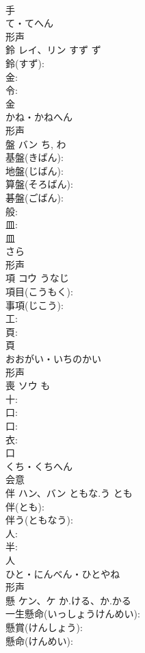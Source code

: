 \documentclass[8pt]{extreport}
\begin{document}
\begin{CJK}{UTF8}{min}
\\	手	
\\	て・てへん	
\\	形声 
\\	鈴	レイ、リン	すず	ず	
\\	鈴(すず): 
\\	金: 
\\	令: 
\\	金	
\\	かね・かねへん	
\\	形声 
\\	盤	バン		ち, わ	
\\	基盤(きばん): 
\\	地盤(じばん): 
\\	算盤(そろばん): 
\\	碁盤(ごばん): 
\\	般: 
\\	皿: 
\\	皿	
\\	さら	
\\	形声 
\\	項	コウ	うなじ		
\\	項目(こうもく): 
\\	事項(じこう): 
\\	工: 
\\	頁: 
\\	頁	
\\	おおがい・いちのかい	
\\	形声 
\\	喪	ソウ	も		
\\	十: 
\\	口: 
\\	口: 
\\	衣: 
\\	口	
\\	くち・くちへん	
\\	会意 
\\	伴	ハン、バン	ともな.う	とも	
\\	伴(とも): 
\\	伴う(ともなう): 
\\	人: 
\\	半: 
\\	人	
\\	ひと・にんべん・ひとやね	
\\	形声 
\\	懸	ケン、ケ	か.ける、か.かる		
\\	一生懸命(いっしょうけんめい): 
\\	懸賞(けんしょう): 
\\	懸命(けんめい): 

\end{CJK}
\end{document}
